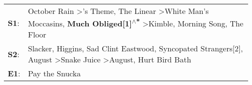 \begin{supertabular}{p{0.03\textwidth}p{0.92\textwidth}}
 \textbf{S1}:  &  October Rain\textsuperscript{} \textgreater {}'s Theme\textsuperscript{}, \enspace The Linear\textsuperscript{} \textgreater \enspace White Man's Moccasins\textsuperscript{}, \enspace \textbf{Much Obliged[1]\textsuperscript{$\wedge$*}} \textgreater \enspace Kimble\textsuperscript{}, \enspace Morning Song\textsuperscript{}, \enspace The Floor\textsuperscript{}  \enspace  \\
 \textbf{S2}:  &                                   Slacker\textsuperscript{}, \enspace Higgins\textsuperscript{}, \enspace Sad Clint Eastwood\textsuperscript{}, \enspace Syncopated Strangers[2]\textsuperscript{}, \enspace August\textsuperscript{} \textgreater \enspace Snake Juice\textsuperscript{} \textgreater \enspace August\textsuperscript{}, \enspace Hurt Bird Bath\textsuperscript{}  \enspace  \\
 \textbf{E1}:  &                                                                                                                                                                                                                                                                                                                                                    Pay the Snucka\textsuperscript{}  \enspace  \\
\end{supertabular}
